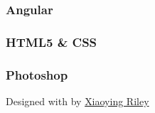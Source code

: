 \documentclass[
]{article}
\begin{document}
\hypertarget{angular}{%
\subsubsection{Angular}\label{angular}}

\hypertarget{html5-css}{%
\subsubsection{HTML5 \& CSS}\label{html5-css}}

\hypertarget{photoshop}{%
\subsubsection{Photoshop}\label{photoshop}}

{Designed with \emph{} by \href{http://themes.3rdwavemedia.com}{Xiaoying
Riley}}
\end{document}

